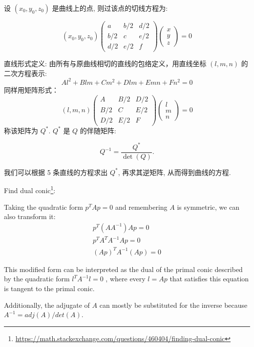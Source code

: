 设 $(x_0,y_0,z_0)$ 是曲线上的点,  则过该点的切线方程为:

\[
  (x_0,y_0,z_0) \begin{pmatrix} a & b/2 & d/2 \\ b/2 & c & e/2 \\ d/2 & e/2 & f \end{pmatrix} \begin{pmatrix} x \\ y \\ z \end{pmatrix} = 0
\]


直线形式定义: 由所有与原曲线相切的直线的包络定义，用直线坐标 \( (l, m, n) \) 的二次方程表示:
  \[
  Al^2 + Blm + Cm^2 + Dlm + Emn + Fn^2 = 0
  \]
同样用矩阵形式：
  \[
  (l, m, n) \begin{pmatrix} A & B/2 & D/2 \\ B/2 & C & E/2 \\ D/2 & E/2 & F \end{pmatrix} \begin{pmatrix} l \\ m \\ n \end{pmatrix} = 0
  \]
称该矩阵为 $Q^*$. $Q^*$ 是 $Q$ 的伴随矩阵:

\[
  Q^{-1} = \dfrac{Q^*}{\det(Q)}.
\]

我们可以根据 5 条直线的方程求出 $Q^*$, 再求其逆矩阵, 从而得到曲线的方程.

Find dual conic\footnote{\url{https://math.stackexchange.com/questions/460404/finding-dual-conic}}:

Taking the quadratic form $p^TAp=0$ and remembering $A$ 
is symmetric, we can also transform it:
\begin{gather*}
  p^T(AA^{-1})Ap=0 \\
  p^TA^TA^{-1}Ap=0 \\
  (Ap)^TA^{-1}(Ap)=0 
\end{gather*}

This modified form can be interpreted as the dual of the primal conic described by the quadratic form $l^𝑇𝐴^{−1}l=0$
, where every $l=Ap$ that satisfies this equation is tangent to the primal conic.

Additionally, the adjugate of $A$ can mostly be substituted for the inverse because $A^{-1}=adj(A)/det(A)$.
